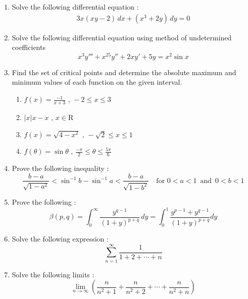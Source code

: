 \documentclass[12pt , a4paper]{article}
\begin{document}
\begin{enumerate}
\item Solve the following differential equation :          
\begin{align*}
3x(xy - 2)\,dx +(x^3+2y)\,dy=0 
\end{align*}
\item Solve the following differential equation using method of undetermined coefficients
\begin{equation*}
x^3y''' + x^25y'' + 2xy' + 5y = x^2\sin x
\end{equation*}
\item Find the set of critical points and determine the absolute maximum and minimum
values of each function on the given interval.
	\begin{enumerate}
	\item $ \displaystyle{f(x)=\frac{-1}{x+3}}\,\, , \,-2\leq x \leq 3 $
	\item $ |x|x-x \,\, ,\, x \in \mathrm{R} $
	\item $ \displaystyle f(x)=\sqrt{4-x^2} \, \, ,\, -\sqrt{2}\leq x \leq 1 $
	\item $ \displaystyle f(\theta)= \sin \theta \,\, ,\, \frac{-\pi}{2} \leq \theta \leq \frac{5\pi}{6} $
	\end{enumerate}
\item Prove the following inequality :
\begin{equation*}
\frac{b-a}{\sqrt{1-a^2}} < \sin ^{-1} b - \sin ^{-1} a < \frac{b-a}{\sqrt{1-b^2}}\,\,\,\,\,\, \mathrm{for} \,\, 0 < a < 1\,\,\, \mathrm{and}\,\,\, 0 < b < 1
\end{equation*}

\newpage
\item Prove the following :
\begin{equation*}
\displaystyle \beta (p,q) = \int_0^\infty \frac{y^{q-1}}{(1+y)^{p+q}}\,dy = \int_0^1 \frac{y^{p-1}+y^{q-1}}{(1+y)^{p+q}}dy
\end{equation*}

\item Solve the following expression :
\begin{equation*}
\displaystyle\sum \limits_{n=1}^{\infty} \frac{1}{1+2+\cdots+n} 
\end{equation*}

\item Solve the following limits :
\begin{equation*}
\lim \limits_{n \to \infty} \left(\frac{n}{n^2+1} + \frac{n}{n^2+2}+\cdots+\frac{n}{n^2+n}\right)
\end{equation*}
\end{enumerate}
\end{document}
